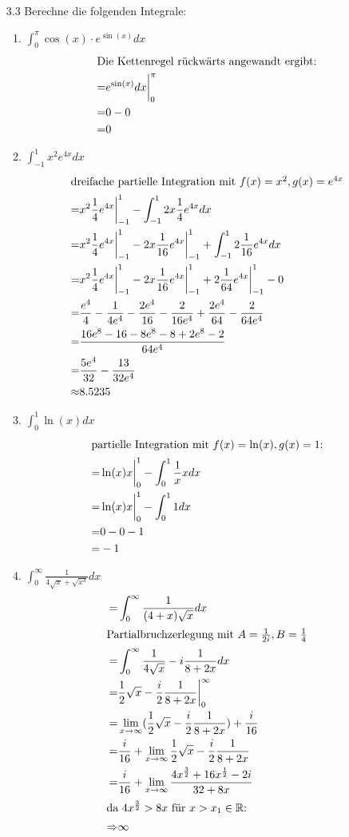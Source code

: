 \documentclass{HM}
\begin{document}
	\begin{enumerate}
		\item[3.3] Berechne die folgenden Integrale:
		\begin{enumerate}
			\item $\int_0^\pi\cos(x)\cdot e^{\sin(x)}dx$
			\begin{align*}
				\intertext{Die Kettenregel rückwärts angewandt ergibt:}
				=&e^{\sin(x)}dx\biggr|_0^\pi\\
				=&0-0\\
				=&0
			\end{align*}
			\item $\int_{-1}^1x^2e^{4x}dx$
			\begin{align*}
				\intertext{dreifache partielle Integration mit $f(x)=x^2, g(x)=e^{4x}$}
				=&x^2\frac{1}{4}e^{4x}\biggr|_{-1}^1 - \int_{-1}^12x\frac{1}{4}e^{4x}dx\\
				=&x^2\frac{1}{4}e^{4x}\biggr|_{-1}^1 - 2x\frac{1}{16}e^{4x}\biggr|_{-1}^1 + \int_{-1}^12\frac{1}{16}e^{4x}dx\\
				=&x^2\frac{1}{4}e^{4x}\biggr|_{-1}^1 - 2x\frac{1}{16}e^{4x}\biggr|_{-1}^1 + 2\frac{1}{64}e^{4x}\biggr|_{-1}^1-0\\
				=&\frac{e^4}{4}-\frac{1}{4e^4}-\frac{2e^4}{16}-\frac{2}{16e^4}+\frac{2e^4}{64}-\frac{2}{64e^4}\\
				=&\frac{16e^8-16-8e^8-8+2e^8-2}{64e^4}	\\
				=&\frac{5e^4}{32}-\frac{13}{32e^4}\\
				\approx& 8.5235
			\end{align*}
			\item $\int_0^1\ln(x)dx$
			\begin{align*}
				\intertext{partielle Integration mit $f(x)=\ln(x), g(x)=1$:}
				=&\ln(x)x\biggr|_0^1 - \int_0^1\frac{1}{x}xdx\\
				=&\ln(x)x\biggr|_0^1 - \int_0^11dx\\
				=&0-0-1\\
				=&-1
			\end{align*}
			\item $\int_0^\infty\frac{1}{4\sqrt{x}+\sqrt{x^3}}dx$
			\begin{align*}
				=&\int_0^\infty\frac{1}{(4+x)\sqrt{x}}dx\\
				\intertext{Partialbruchzerlegung mit $A=\frac{1}{2i},B=\frac{1}{4}$}
				=&\int_0^\infty\frac{1}{4\sqrt{x}}-i\frac{1}{8+2x}dx\\
				=&\frac{1}{2}\sqrt{x}-\frac{i}{2}\frac{1}{8+2x}\biggr|_0^\infty\\
				=&\lim_{x\to\infty}(\frac{1}{2}\sqrt{x}-\frac{i}{2}\frac{1}{8+2x})+\frac{i}{16}\\
				=&\frac{i}{16}+\lim_{x\to\infty}\frac{1}{2}\sqrt{x}-\frac{i}{2}\frac{1}{8+2x}\\
				=&\frac{i}{16}+\lim_{x\to\infty}\frac{4x^{\frac{3}{2}}+16x^{\frac{1}{2}}-2i}{32+8x}\\
				\intertext{da $4x^{\frac{3}{2}}>8x$ für $x>x_1\in\mathbb{R}$:}
				\Rightarrow&\infty
			\end{align*}
		\end{enumerate}
		

\end{enumerate}
\end{document}
